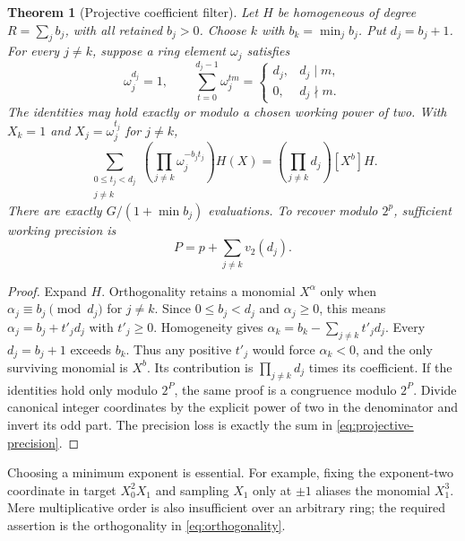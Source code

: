 \documentclass[11pt,letterpaper]{article}
\newtheorem{theorem}{Theorem}[section]
\theoremstyle{definition}\newtheorem{definition}[theorem]{Definition}
\theoremstyle{remark}\newtheorem{remark}[theorem]{Remark}
\newcommand{\vv}{v_2}
\begin{document}
\begin{theorem}[Projective coefficient filter]\label{thm:projective}
Let $H$ be homogeneous of degree $R=\sum_jb_j$, with all retained
$b_j>0$. Choose $k$ with $b_k=\min_j b_j$. Put $d_j=b_j+1$.
For every $j\ne k$, suppose a ring element $\omega_j$ satisfies
\begin{equation}\label{eq:orthogonality}
 \omega_j^{d_j}=1,\qquad
 \sum_{t=0}^{d_j-1}\omega_j^{tm}
 =\begin{cases}d_j,&d_j\mid m,\\0,&d_j\nmid m.\end{cases}
\end{equation}
The identities may hold exactly or modulo a chosen working power of two.
With $X_k=1$ and $X_j=\omega_j^{t_j}$ for $j\ne k$,
\begin{equation}\label{eq:projective-identity}
 \sum_{\substack{0\le t_j<d_j\\j\ne k}}
 \left(\prod_{j\ne k}\omega_j^{-b_jt_j}\right)H(X)
 =\left(\prod_{j\ne k}d_j\right)[X^b]H.
\end{equation}
There are exactly $G/(1+\min b_j)$ evaluations. To recover modulo
$2^p$, sufficient working precision is
\begin{equation}\label{eq:projective-precision}
 P=p+\sum_{j\ne k}\vv(d_j).
\end{equation}
\end{theorem}
\begin{proof}
Expand $H$. Orthogonality retains a monomial $X^\alpha$ only when
$\alpha_j\equiv b_j\pmod{d_j}$ for $j\ne k$. Since $0\le b_j<d_j$
and $\alpha_j\ge0$, this means $\alpha_j=b_j+t'_jd_j$ with $t'_j\ge0$.
Homogeneity gives $\alpha_k=b_k-\sum_{j\ne k}t'_jd_j$.
Every $d_j=b_j+1$ exceeds $b_k$. Thus any positive $t'_j$ would force
$\alpha_k<0$, and the only surviving monomial is $X^b$.
Its contribution is $\prod_{j\ne k}d_j$ times its coefficient.
If the identities hold only modulo $2^P$, the same proof is a congruence
modulo $2^P$. Divide canonical integer coordinates by the explicit power
of two in the denominator and invert its odd part. The precision loss
is exactly the sum in \eqref{eq:projective-precision}.
\end{proof}

Choosing a minimum exponent is essential. For example, fixing the exponent-two
coordinate in target $X_0^2X_1$ and sampling $X_1$ only at $\pm1$ aliases the
monomial $X_1^3$. Mere multiplicative order is also insufficient over an
arbitrary ring; the required assertion is the orthogonality in
\eqref{eq:orthogonality}.
\end{document}
